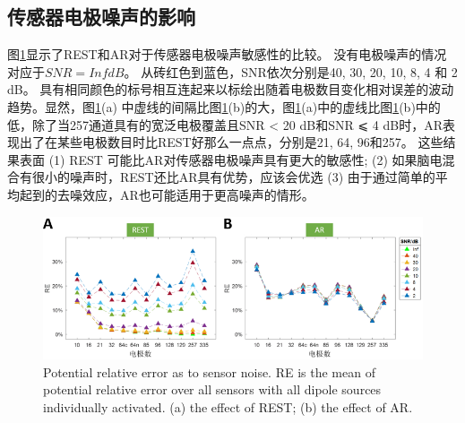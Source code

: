 \subsection{传感器电极噪声的影响}
图\ref{2.8}显示了REST和AR对于传感器电极噪声敏感性的比较。 没有电极噪声的情况对应于$SNR=Inf dB$。 从砖红色到蓝色，SNR依次分别是40, 30, 20, 10, 8, 4 和 2 dB。 具有相同颜色的标号相互连起来以标绘出随着电极数目变化相对误差的波动趋势。显然，图\ref{2.8}(a) 中虚线的间隔比图\ref{2.8}(b)的大，图\ref{2.8}(a)中的虚线比图\ref{2.8}(b)中的低，除了当257通道具有的宽泛电极覆盖且SNR < 20 dB和SNR ⩽ 4 dB时，AR表现出了在某些电极数目时比REST好那么一点点，分别是21, 64, 96和257。 这些结果表面 (1) REST
可能比AR对传感器电极噪声具有更大的敏感性; (2) 如果脑电混合有很小的噪声时，REST还比AR具有优势，应该会优选 (3) 由于通过简单的平均起到的去噪效应，AR也可能适用于更高噪声的情形。
\begin{figure}[h!]
	\centering
	\includegraphics[width=15cm]{pic/JNE/figure8.png}
	\caption{Potential relative error as to sensor noise. RE is the mean of potential relative error over all sensors with all dipole sources individually activated. (a) the effect of REST; (b) the effect of AR.}
	\label{2.8}
\end{figure}
